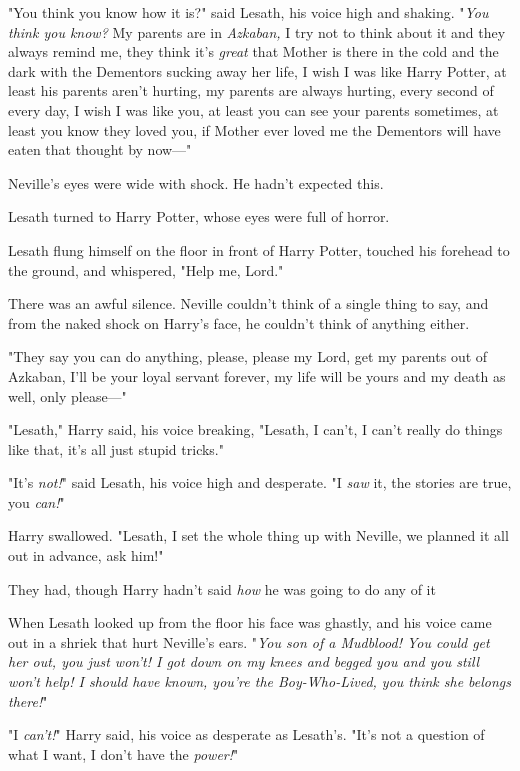 "You think you know how it is?" said Lesath, his voice high and shaking.
"\emph{You think you know?} My parents are in \emph{Azkaban,} I try not to
think about it and they always remind me, they think it's \emph{great} that
Mother is there in the cold and the dark with the Dementors sucking away her
life, I wish I was like Harry Potter, at least his parents aren't hurting, my
parents are always hurting, every second of every day, I wish I was like you,
at least you can see your parents sometimes, at least you know they loved you,
if Mother ever loved me the Dementors will have eaten that thought by now\mbox{---}"

Neville's eyes were wide with shock. He hadn't expected this.

Lesath turned to Harry Potter, whose eyes were full of horror.

Lesath flung himself on the floor in front of Harry Potter, touched his
forehead to the ground, and whispered, "Help me, Lord."

There was an awful silence. Neville couldn't think of a single thing to say,
and from the naked shock on Harry's face, he couldn't think of anything either.

"They say you can do anything, please, please my Lord, get my parents out of
Azkaban, I'll be your loyal servant forever, my life will be yours and my death
as well, only please\mbox{---}"

"Lesath," Harry said, his voice breaking, "Lesath, I can't, I can't really do
things like that, it's all just stupid tricks."

"It's \emph{not!}" said Lesath, his voice high and desperate. "I \emph{saw} it,
the stories are true, you \emph{can!}"

Harry swallowed. "Lesath, I set the whole thing up with Neville, we planned it
all out in advance, ask him!"

They had, though Harry hadn't said \emph{how} he was going to do any of
it{\el}

When Lesath looked up from the floor his face was ghastly, and his voice came
out in a shriek that hurt Neville's ears. "\emph{You son of a Mudblood! You
could get her out, you just won't! I got down on my knees and begged you and
you still won't help! I should have known, you're the Boy-Who-Lived, you think
she belongs there!}"

"I \emph{can't!}" Harry said, his voice as desperate as Lesath's. "It's not a
question of what I want, I don't have the \emph{power!}"


